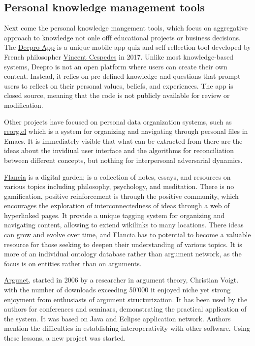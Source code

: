 \documentclass{report}
\begin{document}
\subsection{Personal knowledge management tools}
Next come the personal knowledge mangement tools, which focus on aggregative approach to knowledge not onle offf educational projects or business decisions.
The \href{https://play.google.com/store/apps/details?id=fr.deepro.app&hl=en_US}{Deepro App} is a unique mobile app quiz and self-reflection tool developed by French philosopher \href{https://en.wikipedia.org/wiki/Vincent_Cespedes}{Vincent Cespedes} in 2017. Unlike most knowledge-based systems, Deepro is not an open platform where users can create their own content. Instead, it relies on pre-defined knowledge and questions that prompt users to reflect on their personal values, beliefs, and experiences. The app is closed source, meaning that the code is not publicly available for review or modification.

Other projects have focused on personal data organization systems, such as \href{https://github.com/senters/reorg.el}{reorg.el} which is a system for organizing and navigating through personal files in Emacs. It is immediately visible that what can be extracted from there are the ideas about the invidiual user interface and the algorithms for reconciliation between different concepts, but nothing for interpersonal adversarial dynamics.

\href{https://flancia.org/}{Flancia} is a digital garden; is a collection of notes, essays, and resources on various topics including philosophy, psychology, and meditation. There is no gamification, positive reinforcement is through the positive community, which encourages the exploration of interconnectedness of ideas through a web of hyperlinked pages. It provide a unique tagging system for organizing and navigating content, allowing to extend wikilinks to many locations. There ideas can grow and evolve over time, and Flancia has to potential to become a valuable resource for those seeking to deepen their understanding of various topics. It is more of an individual ontology database rather than argument network, as the focus is on entities rather than on arguments.

\href{http://www.argunet.org/}{Argunet}, started in 2006 by a researcher in argument theory, Christian Voigt. with the number of downloads exceeding 50'000 it enjoyed niche yet strong enjoyment from enthusiasts of argument structurization. It has been used by the authors for conferences and seminars, demonstrating the practical application of the system. It was based on Java and Eclipse application network. Authors mention the difficulties in establishing interoperativity with other software. Using these lessons, a new project was started.
\end{document}
